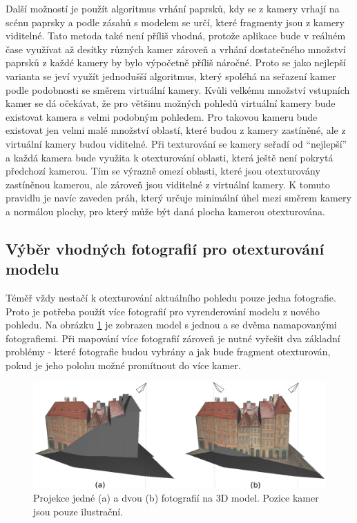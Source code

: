 \documentclass[11pt,twoside,a4paper]{book}
\begin{document}
Další možností je použít algoritmus vrhání paprsků, kdy se z kamery vrhají na scénu paprsky a podle zásahů s modelem se určí, které fragmenty jsou z kamery viditelné. Tato metoda také není příliš vhodná, protože aplikace bude v reálném čase využívat až desítky různých kamer zároveň a vrhání dostatečného množství paprsků z každé kamery by bylo výpočetně příliš náročné. Proto se jako nejlepší varianta se jeví využít jednodušší algoritmus, který spoléhá na seřazení kamer podle podobnosti se směrem virtuální kamery. Kvůli velkému množství vstupních kamer se dá očekávat, že pro většinu možných pohledů virtuální kamery bude existovat kamera s velmi podobným pohledem. Pro takovou kameru bude existovat jen velmi malé množství oblastí, které budou z kamery zastíněné, ale z virtuální kamery budou viditelné. Při texturování se kamery seřadí od ``nejlepší'' a každá kamera bude využita k otexturování oblasti, která ještě není pokrytá předchozí kamerou. Tím se výrazně omezí oblasti, které jsou otexturovány zastíněnou kamerou, ale zároveň jsou viditelné z virtuální kamery. K tomuto pravidlu je navíc zaveden práh, který určuje minimální úhel mezi směrem kamery a normálou plochy, pro který může být daná plocha kamerou otexturována. 

\newpage
\subsection{Výběr vhodných fotografií pro otexturování modelu}
\label{sec:photo-choosing}

Téměř vždy nestačí k otexturování aktuálního pohledu pouze jedna fotografie. Proto je potřeba použít více fotografií pro vyrenderování modelu z nového pohledu. Na obrázku \ref{fig:dum-1} je zobrazen model s jednou a se dvěma namapovanými fotografiemi.  Při mapování více fotografií zároveň je nutné vyřešit dva základní problémy - které fotografie budou vybrány a jak bude fragment otexturován, pokud je jeho polohu možné promítnout do více kamer.

\begin{figure}[h]
\begin{center}
\includegraphics[width=\textwidth]{figures/dum-1}
\caption{Projekce jedné (a) a dvou (b) fotografií na 3D model. Pozice kamer jsou pouze ilustrační.}
\label{fig:dum-1}
\end{center}
\end{figure}
\end{document}
